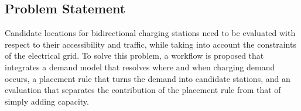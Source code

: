 \subsection{Problem Statement}
\label{subsec:problem}
Candidate locations for bidirectional charging stations need to be evaluated with respect to their accessibility and traffic, while taking into account the constraints of the electrical grid. To solve this problem, a workflow is proposed that integrates a demand model that resolves where and when charging demand occurs, a placement rule that turns the demand into candidate stations, and an evaluation that separates the contribution of the placement rule from that of simply adding capacity.
